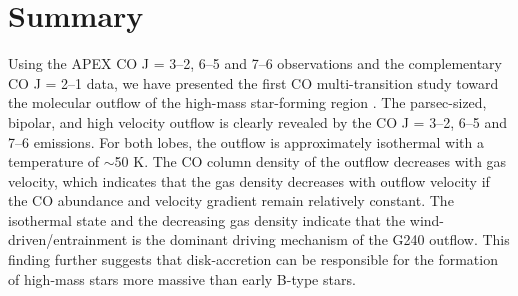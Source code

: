 \section{Summary}\label{summary}

Using the APEX CO J = 3--2, 6--5 and 7--6 observations and the complementary CO J = 2--1 data, we have presented the first CO multi-transition study toward the molecular outflow of the high-mass star-forming region . The parsec-sized, bipolar, and high velocity outflow is clearly revealed by the CO J = 3--2, 6--5 and 7--6 emissions. For both lobes, the outflow is approximately isothermal with a temperature of $\sim$50 K. The CO column density of the outflow decreases with gas velocity, which indicates that the gas density decreases with outflow velocity if the CO abundance and velocity gradient remain relatively constant. The isothermal state and the decreasing gas density indicate that the wind-driven/entrainment is the dominant driving mechanism of the G240 outflow. This finding further suggests that disk-accretion can be responsible for the formation of high-mass stars more massive than early B-type stars.

